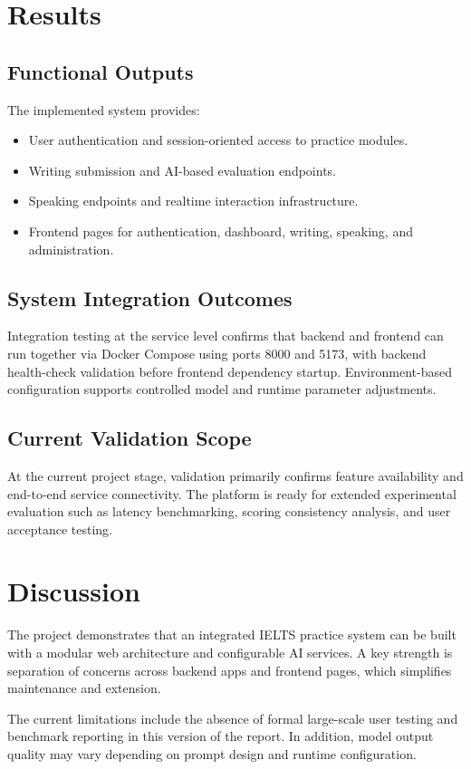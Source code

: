 ﻿\documentclass[conference]{IEEEtran}
\begin{document}
\section{Results}
\subsection{Functional Outputs}
The implemented system provides:
\begin{itemize}
    \item User authentication and session-oriented access to practice modules.
    \item Writing submission and AI-based evaluation endpoints.
    \item Speaking endpoints and realtime interaction infrastructure.
    \item Frontend pages for authentication, dashboard, writing, speaking, and administration.
\end{itemize}

\subsection{System Integration Outcomes}
Integration testing at the service level confirms that backend and frontend can run together via Docker Compose using ports 8000 and 5173, with backend health-check validation before frontend dependency startup. Environment-based configuration supports controlled model and runtime parameter adjustments.

\subsection{Current Validation Scope}
At the current project stage, validation primarily confirms feature availability and end-to-end service connectivity. The platform is ready for extended experimental evaluation such as latency benchmarking, scoring consistency analysis, and user acceptance testing.

\section{Discussion}
The project demonstrates that an integrated IELTS practice system can be built with a modular web architecture and configurable AI services. A key strength is separation of concerns across backend apps and frontend pages, which simplifies maintenance and extension.

The current limitations include the absence of formal large-scale user testing and benchmark reporting in this version of the report. In addition, model output quality may vary depending on prompt design and runtime configuration.
\end{document}
